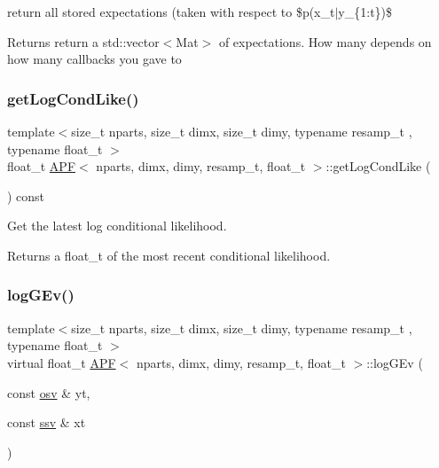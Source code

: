 return all stored expectations (taken with respect to \$p(x\+\_\+t$\vert$y\+\_\+\{1\+:t\})\$ 

\begin{DoxyReturn}{Returns}
return a std\+::vector$<$\+Mat$>$ of expectations. How many depends on how many callbacks you gave to 
\end{DoxyReturn}
\mbox{\label{classAPF_adc35c009dcf5b3289a4d46279527e024}} 
\subsubsection{\texorpdfstring{get\+Log\+Cond\+Like()}{getLogCondLike()}}
{\footnotesize\ttfamily template$<$size\+\_\+t nparts, size\+\_\+t dimx, size\+\_\+t dimy, typename resamp\+\_\+t , typename float\+\_\+t $>$ \\
float\+\_\+t \hyperlink{classAPF}{A\+PF}$<$ nparts, dimx, dimy, resamp\+\_\+t, float\+\_\+t $>$\+::get\+Log\+Cond\+Like (\begin{DoxyParamCaption}{ }\end{DoxyParamCaption}) const}



Get the latest log conditional likelihood. 

\begin{DoxyReturn}{Returns}
a float\+\_\+t of the most recent conditional likelihood. 
\end{DoxyReturn}
\mbox{\label{classAPF_ab81a714dacc1ee5ea1aa66ffee46f832}} 
\subsubsection{\texorpdfstring{log\+G\+Ev()}{logGEv()}}
{\footnotesize\ttfamily template$<$size\+\_\+t nparts, size\+\_\+t dimx, size\+\_\+t dimy, typename resamp\+\_\+t , typename float\+\_\+t $>$ \\
virtual float\+\_\+t \hyperlink{classAPF}{A\+PF}$<$ nparts, dimx, dimy, resamp\+\_\+t, float\+\_\+t $>$\+::log\+G\+Ev (\begin{DoxyParamCaption}\item[{const \hyperlink{classAPF_aa8ac25c475e54ddf21999f28727a049e}{osv} \&}]{yt,  }\item[{const \hyperlink{classAPF_a5f96da87f00ff75af1232f9021daf06a}{ssv} \&}]{xt }\end{DoxyParamCaption})\hspace{0.3cm}{\ttfamily [pure virtual]}}



